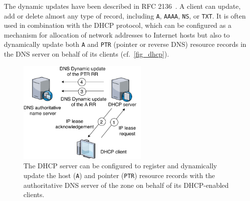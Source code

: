 The dynamic updates have been described in RFC 2136~\cite{rfc2136}. 
A client can update, add or delete almost any type of record, including \texttt{A}, \texttt{AAAA}, \texttt{NS}, or \texttt{TXT}.
It is often used %
in combination with the DHCP protocol, which can be configured %
as a mechanism for allocation of network addresses to Internet hosts but also to dynamically update both \texttt{A} and \texttt{PTR} (pointer or reverse DNS) resource records in the DNS server %
on behalf of its clients (cf.~\autoref{fig_dhcp}).

\begin{figure}[!ht]
\centering
\includegraphics[width=2.5in]{figs/dhcp.pdf}
\caption{The DHCP server can be configured to register and dynamically update the host (\texttt{A}) and pointer (\texttt{PTR}) resource records with the authoritative DNS server of the zone on behalf of its DHCP-enabled clients.
}
\label{fig_dhcp}
\end{figure}



%



